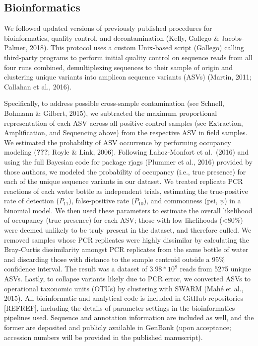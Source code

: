 \documentclass[
]{article}
\begin{document}
\hypertarget{bioinformatics}{%
\subsection{Bioinformatics}\label{bioinformatics}}

We followed updated versions of previously published procedures for
bioinformatics, quality control, and decontamination (Kelly, Gallego \&
Jacobs-Palmer, 2018). This protocol uses a custom Unix-based script
(Gallego) calling third-party programs to perform initial quality
control on sequence reads from all four runs combined, demultiplexing
sequences to their sample of origin and clustering unique variants into
amplicon sequence variants (ASVs) (Martin, 2011; Callahan et al., 2016).

Specifically, to address possible cross-sample contamination (see
Schnell, Bohmann \& Gilbert, 2015), we subtracted the maximum
proportional representation of each ASV across all positive control
samples (see Extraction, Amplification, and Sequencing above) from the
respective ASV in field samples. We estimated the probability of ASV
occurrence by performing occupancy modeling ({\textbf{???}}; Royle \&
Link, 2006). Following Lahoz-Monfort et al.~(2016) and using the full
Bayesian code for package rjags (Plummer et al., 2016) provided by those
authors, we modeled the probability of occupancy (i.e., true presence)
for each of the unique sequence variants in our dataset. We treated
replicate PCR reactions of each water bottle as independent trials,
estimating the true-positive rate of detection (\(P_{11}\)),
false-positive rate (\(P_{10}\)), and commonness (psi, \(\psi\)) in a
binomial model. We then used these parameters to estimate the overall
likelihood of occupancy (true presence) for each ASV; those with low
likelihoods (\textless80\%) were deemed unlikely to be truly present in
the dataset, and therefore culled. We removed samples whose PCR
replicates were highly dissimilar by calculating the Bray-Curtis
dissimilarity amongst PCR replicates from the same bottle of water and
discarding those with distance to the sample centroid outside a 95\%
confidence interval. The result was a dataset of \(3.98 * 10^{8}\) reads
from 5275 unique ASVs. Lastly, to collapse variants likely due to PCR
error, we converted ASVs to operational taxonomic units (OTUs) by
clustering with SWARM (Mahé et al., 2015). All bioinformatic and
analytical code is included in GitHub repositories {[}REFREF{]},
including the details of parameter settings in the bioinformatics
pipelines used. Sequence and annotation information are included as
well, and the former are deposited and publicly available in GenBank
(upon acceptance; accession numbers will be provided in the published
manuscript).
\end{document}
